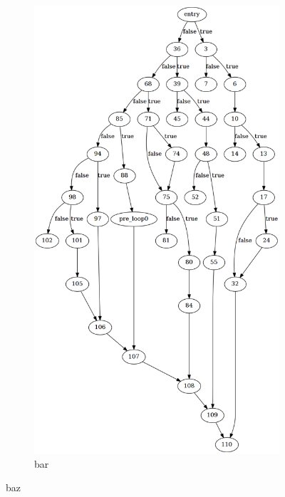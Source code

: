 \begin{figure}[htbp]
\begin{subfigure}[t]{0.45\textwidth}
		\includegraphics[width=\textwidth]{appendices/stmt_example/stmt_1.png}
		\caption{bar}
	\end{subfigure}
	\caption{baz}
\end{figure}
